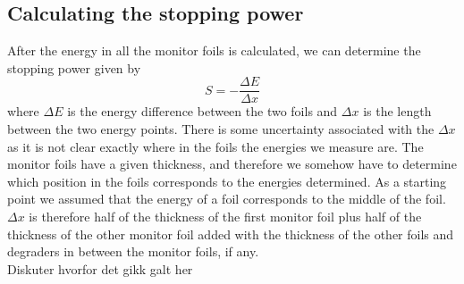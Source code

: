 \subsection{Calculating the stopping power}
After the energy in all the monitor foils is calculated, we can determine the stopping power given by
\begin{equation}
    S = -\frac{\Delta E}{\Delta x}
\end{equation}
where $\Delta E$ is the energy difference between the two foils and $\Delta x$ is the length between the two energy points. There is some uncertainty associated with the $\Delta x$ as it is not clear exactly where in the foils the energies we measure are. The monitor foils have a given thickness, and therefore we somehow have to determine which position in the foils corresponds to the energies determined. As a starting point we assumed that the energy of a foil corresponds to the middle of the foil. $\Delta x$ is therefore half of the thickness of the first monitor foil plus half of the thickness of the other monitor foil added with the thickness of the other foils and degraders in between the monitor foils, if any. 
\vspace{3mm}
\\
Diskuter hvorfor det gikk galt her







